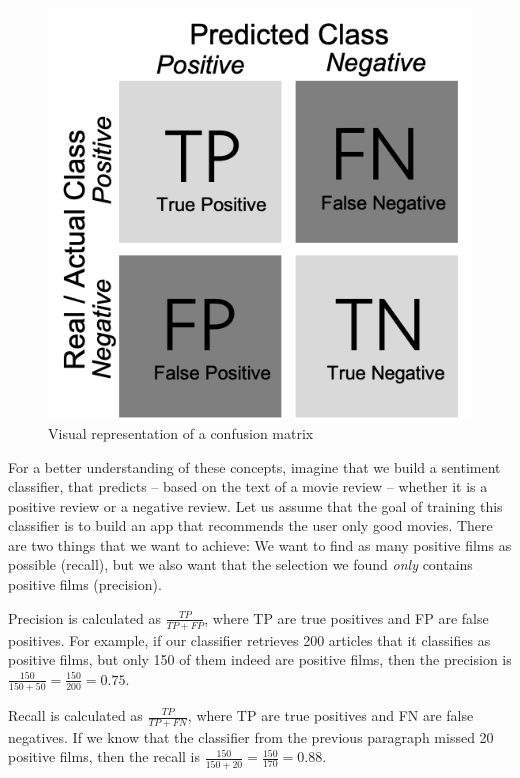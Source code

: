 \begin{figure} 
\centering
\includegraphics[width=\linewidth]{figures/ch09_matrix}
\caption{Visual representation of a confusion matrix}
\label{fig:matrix}
\end{figure}

For a better understanding of these concepts, imagine that we build a sentiment classifier, that predicts -- based on the
text of a movie review -- whether it is a positive review or a
negative review. Let us assume that the goal of training this classifier is to build an app that recommends the user only good movies. There are two things
that we want to achieve: We want to find as many positive films as possible (recall), but we also want that the selection we found
\emph{only} contains positive films (precision).

Precision is calculated as $\frac{TP}{TP+FP}$, where TP are true
positives and FP are false positives. For example, if our classifier
retrieves 200 articles that it classifies as positive films, but only
150 of them indeed are positive films, then the precision is
$\frac{150}{150+50} = \frac{150}{200} = 0.75$.

Recall is calculated as $\frac{TP}{TP+FN}$, where TP are true
positives and FN are false negatives. If we know that the classifier
from the previous paragraph missed 20 positive films, then the recall
is $\frac{150}{150+20} = \frac{150}{170}= 0.88$.

